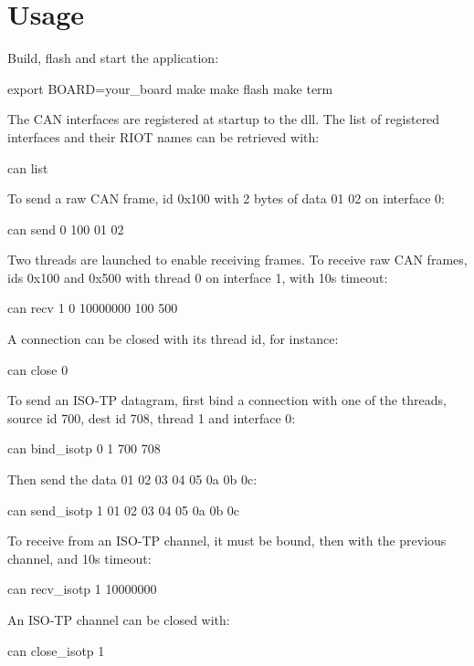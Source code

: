 \section*{Usage }

Build, flash and start the application\+: 
\begin{DoxyCode}
export BOARD=your\_board
make
make flash
make term
\end{DoxyCode}


The C\+AN interfaces are registered at startup to the dll. The list of registered interfaces and their R\+I\+OT names can be retrieved with\+: 
\begin{DoxyCode}
can list
\end{DoxyCode}


To send a raw C\+AN frame, id 0x100 with 2 bytes of data 01 02 on interface 0\+: 
\begin{DoxyCode}
can send 0 100 01 02
\end{DoxyCode}


Two threads are launched to enable receiving frames. To receive raw C\+AN frames, ids 0x100 and 0x500 with thread 0 on interface 1, with 10s timeout\+: 
\begin{DoxyCode}
can recv 1 0 10000000 100 500
\end{DoxyCode}


A connection can be closed with its thread id, for instance\+: 
\begin{DoxyCode}
can close 0
\end{DoxyCode}


To send an I\+S\+O-\/\+TP datagram, first bind a connection with one of the threads, source id 700, dest id 708, thread 1 and interface 0\+: 
\begin{DoxyCode}
can bind\_isotp 0 1 700 708
\end{DoxyCode}
 Then send the data 01 02 03 04 05 0a 0b 0c\+: 
\begin{DoxyCode}
can send\_isotp 1 01 02 03 04 05 0a 0b 0c
\end{DoxyCode}


To receive from an I\+S\+O-\/\+TP channel, it must be bound, then with the previous channel, and 10s timeout\+: 
\begin{DoxyCode}
can recv\_isotp 1 10000000
\end{DoxyCode}


An I\+S\+O-\/\+TP channel can be closed with\+: 
\begin{DoxyCode}
can close\_isotp 1
\end{DoxyCode}


